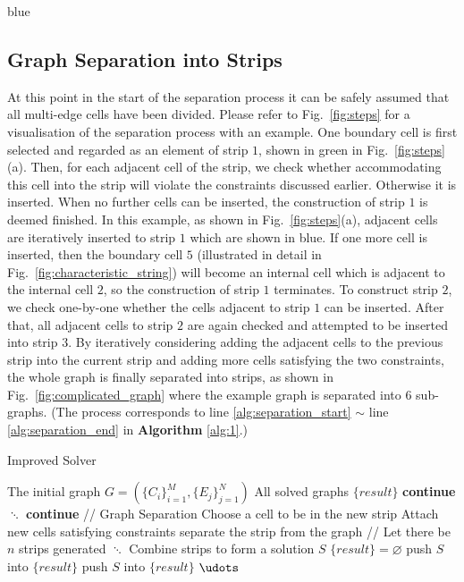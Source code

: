 \documentclass[journal]{IEEEtran}
\begin{document}
\begin{color}{blue}
\subsection{Graph Separation into Strips}
At this point in the start of the separation process it can be safely assumed that all multi-edge cells have been divided. 
Please refer to Fig.~\ref{fig:steps} for a visualisation of the separation process with an example. One boundary cell is first selected and regarded as an element of strip $1$, shown in green in Fig.~\ref{fig:steps}(a).
Then, for each adjacent cell of the strip, we check whether accommodating this cell into the strip will violate the constraints discussed earlier. 
Otherwise it is inserted. 
When no further cells can be inserted, the construction of strip $1$ is deemed finished. 
In this example, as shown in Fig.~\ref{fig:steps}(a), adjacent cells are iteratively inserted to strip $1$ which are shown in blue. If one more cell is inserted, then the boundary cell $5$ (illustrated in detail in Fig.~\ref{fig:characteristic_string}) will become an internal cell which is adjacent to the internal cell $2$, so the construction of strip $1$ terminates.  
To construct strip $2$, we check one-by-one whether the cells adjacent to strip $1$ can be inserted. 
After that, all adjacent cells to strip $2$  are again checked and attempted to be inserted into strip $3$. 
By iteratively considering adding the adjacent cells to the previous strip into the current strip and adding more cells satisfying the two constraints, 
the whole graph is finally separated into strips, as shown in Fig.~\ref{fig:complicated_graph} where the example graph is separated into $6$ sub-graphs. (The process corresponds to line \ref{alg:separation_start} $\sim$ line \ref{alg:separation_end} in \textbf{Algorithm} \ref{alg:1}.) 


\begin{algorithm}[t]
    \caption{Improved Solver}\label{alg:1}
    \begin{algorithmic}[1]
        \Require The initial graph $G = (\{C_i\}_{i = 1}^M, \{E_j\}_{j = 1}^N)$  
        \Ensure All solved graphs $\{result\}$  
\State \textbf{continue}
\EndIf
\State $\ddots$
	\State \textbf{continue}
	\EndIf
	\State // Graph Separation
		\label{alg:separation_start}
		\State Choose a cell to be in the new strip
		\State Attach new cells satisfying constraints
		\State separate the strip from the graph
		\EndWhile\label{alg:separation_end}
		\State // Let there be $n$ strips generated
		\State $\ddots$
		\State Combine strips to form a solution $S$\label{alg:combining_start}
		\State $\{result\} = \varnothing$
		\State push $S$ into $\{result\}$
		\Else
			\State push $S$ into $\{result\}$
		\EndIf
		\EndIf\label{alg:combining_end}
		\EndFor
		\State $\udots$
		\EndFor


\end{algorithmic}
\end{algorithm}
\end{color}
\end{document}
